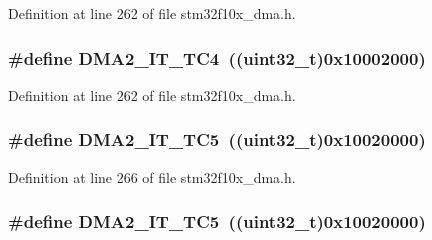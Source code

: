 Definition at line 262 of file stm32f10x\+\_\+dma.\+h.

\subsubsection[{\texorpdfstring{D\+M\+A2\+\_\+\+I\+T\+\_\+\+T\+C4}{DMA2_IT_TC4}}]{\setlength{\rightskip}{0pt plus 5cm}\#define D\+M\+A2\+\_\+\+I\+T\+\_\+\+T\+C4~(({\bf uint32\+\_\+t})0x10002000)}\hypertarget{group___d_m_a__interrupts__definition_ga54b6716e82894f76c87926afe2a65f30}{}\label{group___d_m_a__interrupts__definition_ga54b6716e82894f76c87926afe2a65f30}


Definition at line 262 of file stm32f10x\+\_\+dma.\+h.

\subsubsection[{\texorpdfstring{D\+M\+A2\+\_\+\+I\+T\+\_\+\+T\+C5}{DMA2_IT_TC5}}]{\setlength{\rightskip}{0pt plus 5cm}\#define D\+M\+A2\+\_\+\+I\+T\+\_\+\+T\+C5~(({\bf uint32\+\_\+t})0x10020000)}\hypertarget{group___d_m_a__interrupts__definition_gaa1134531a0aeb8daeb516985562129b0}{}\label{group___d_m_a__interrupts__definition_gaa1134531a0aeb8daeb516985562129b0}


Definition at line 266 of file stm32f10x\+\_\+dma.\+h.

\subsubsection[{\texorpdfstring{D\+M\+A2\+\_\+\+I\+T\+\_\+\+T\+C5}{DMA2_IT_TC5}}]{\setlength{\rightskip}{0pt plus 5cm}\#define D\+M\+A2\+\_\+\+I\+T\+\_\+\+T\+C5~(({\bf uint32\+\_\+t})0x10020000)}\hypertarget{group___d_m_a__interrupts__definition_gaa1134531a0aeb8daeb516985562129b0}{}\label{group___d_m_a__interrupts__definition_gaa1134531a0aeb8daeb516985562129b0}


